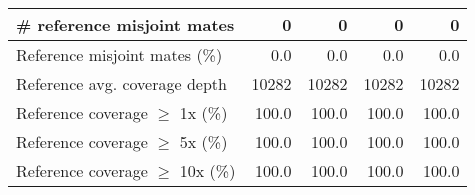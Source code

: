 \documentclass[12pt,a4paper]{article}
\begin{document}
\begin{table}[ht]
\begin{center}
\begin{tabular}{|l*{4}{|r}|}
\# reference misjoint mates & 0 & 0 & 0 & 0 \\ \hline
Reference misjoint mates (\%) & 0.0 & 0.0 & 0.0 & 0.0 \\ \hline
Reference avg. coverage depth & 10282 & 10282 & 10282 & 10282 \\ \hline
Reference coverage $\geq$ 1x (\%) & 100.0 & 100.0 & 100.0 & 100.0 \\ \hline
Reference coverage $\geq$ 5x (\%) & 100.0 & 100.0 & 100.0 & 100.0 \\ \hline
Reference coverage $\geq$ 10x (\%) & 100.0 & 100.0 & 100.0 & 100.0 \\ \hline
\end{tabular}
\end{center}
\end{table}
\end{document}
